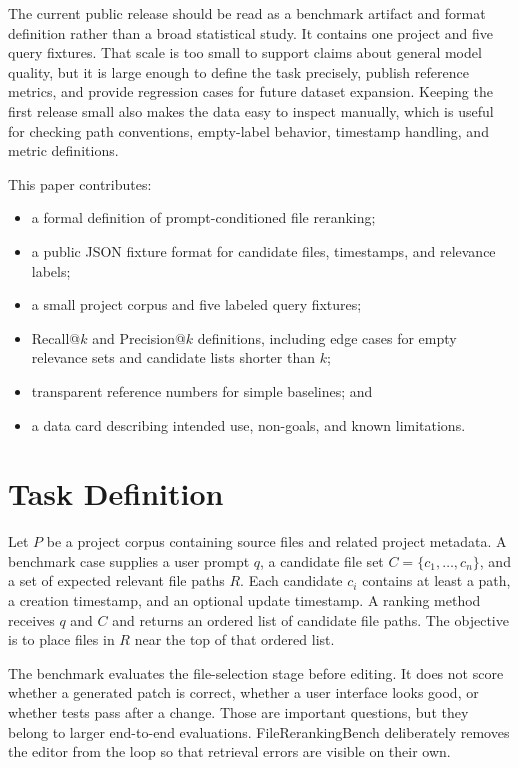 \documentclass[11pt,a4paper]{article}
\begin{document}
The current public release should be read as a benchmark artifact and format
definition rather than a broad statistical study. It contains one project and
five query fixtures. That scale is too small to support claims about general
model quality, but it is large enough to define the task precisely, publish
reference metrics, and provide regression cases for future dataset expansion.
Keeping the first release small also makes the data easy to inspect manually,
which is useful for checking path conventions, empty-label behavior, timestamp
handling, and metric definitions.

This paper contributes:

\begin{itemize}[leftmargin=2em]
\item a formal definition of prompt-conditioned file reranking;
\item a public JSON fixture format for candidate files, timestamps, and
relevance labels;
\item a small project corpus and five labeled query fixtures;
\item Recall@$k$ and Precision@$k$ definitions, including edge cases for empty
relevance sets and candidate lists shorter than $k$;
\item transparent reference numbers for simple baselines; and
\item a data card describing intended use, non-goals, and known limitations.
\end{itemize}

\section{Task Definition}

Let $P$ be a project corpus containing source files and related project
metadata. A benchmark case supplies a user prompt $q$, a candidate file set
$C = \{c_1, \ldots, c_n\}$, and a set of expected relevant file paths $R$.
Each candidate $c_i$ contains at least a path, a creation timestamp, and an
optional update timestamp. A ranking method receives $q$ and $C$ and returns an
ordered list of candidate file paths. The objective is to place files in $R$
near the top of that ordered list.

The benchmark evaluates the file-selection stage before editing. It does not
score whether a generated patch is correct, whether a user interface looks good,
or whether tests pass after a change. Those are important questions, but they
belong to larger end-to-end evaluations. FileRerankingBench deliberately removes
the editor from the loop so that retrieval errors are visible on their own.
\end{document}
